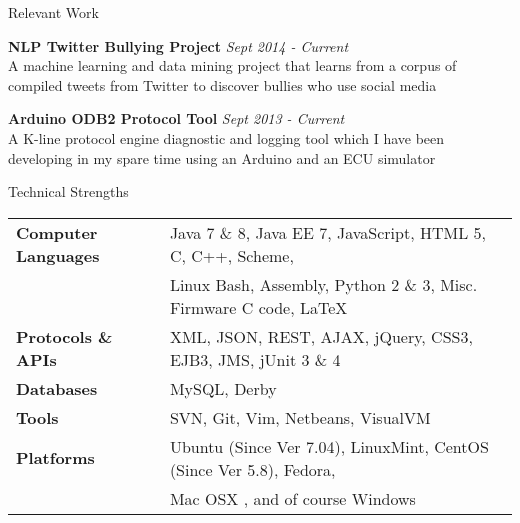 \documentclass{resume} %
\begin{document}
\begin{rSection}{Relevant Work}

{\bf NLP Twitter Bullying Project} \hfill {\em Sept 2014 - Current} \\ 
A machine learning and data mining project that learns from a corpus of compiled tweets from Twitter to discover bullies who use social media

{\bf Arduino ODB2 Protocol Tool} \hfill {\em Sept 2013 - Current} \\ 
A K-line protocol engine diagnostic and logging tool which I have been developing in my spare time using an Arduino and an ECU simulator  \smallskip \\

\end{rSection}




\begin{rSection}{Technical Strengths}

\begin{tabular}{ @{} >{\bfseries}l @{\hspace{6ex}} l }
Computer Languages & Java 7 \& 8, Java EE 7, JavaScript,  HTML 5, C, C++,  Scheme,\\
 					&  Linux Bash, Assembly, Python 2 \& 3, Misc. Firmware C code, \LaTeX \\
 Protocols \& APIs & XML, JSON,  REST, AJAX, jQuery, CSS3, EJB3, JMS, jUnit 3 \& 4 \\
         Databases & MySQL, Derby \\
			 Tools & SVN, Git, Vim, Netbeans, VisualVM \\
		 Platforms & Ubuntu (Since Ver 7.04), LinuxMint, CentOS (Since Ver 5.8), Fedora, \\
 & Mac OSX , and of course Windows \\
\end{tabular}

\end{rSection}





\end{document}
